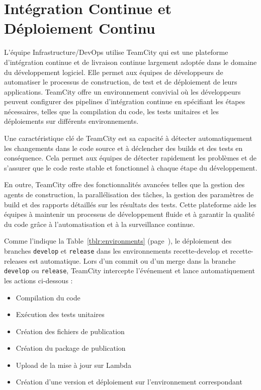 \section{Intégration Continue et Déploiement Continu}\label{sec:ci-cd}

L'équipe Infrastructure/DevOps utilise TeamCity qui est une plateforme d'intégration continue et de livraison continue largement adoptée dans le domaine du développement logiciel. Elle permet aux équipes de développeurs de automatiser le processus de construction, de test et de déploiement de leurs applications. TeamCity offre un environnement convivial où les développeurs peuvent configurer des pipelines d'intégration continue en spécifiant les étapes nécessaires, telles que la compilation du code, les tests unitaires et les déploiements sur différents environnements.

Une caractéristique clé de TeamCity est sa capacité à détecter automatiquement les changements dans le code source et à déclencher des builds et des tests en conséquence. Cela permet aux équipes de détecter rapidement les problèmes et de s'assurer que le code reste stable et fonctionnel à chaque étape du développement.

En outre, TeamCity offre des fonctionnalités avancées telles que la gestion des agents de construction, la parallélisation des tâches, la gestion des paramètres de build et des rapports détaillés sur les résultats des tests. Cette plateforme aide les équipes à maintenir un processus de développement fluide et à garantir la qualité du code grâce à l'automatisation et à la surveillance continue.

Comme l'indique la Table~\ref{tblr:environments} (page~\pageref{tblr:environments}), le déploiement des branches \texttt{develop} et \texttt{release} dans les environnements recette-develop et recette-releases est automatique. Lors d'un commit ou d'un merge dans la branche \texttt{develop} ou \texttt{release}, TeamCity intercepte l'événement et lance automatiquement les actions ci-dessous :

\begin{itemize}
    \item Compilation du code
    \item Exécution des tests unitaires
    \item Création des fichiers de publication
    \item Création du package de publication
    \item Upload de la mise à jour sur Lambda
    \item Création d'une version et déploiement sur l'environnement correspondant
\end{itemize}

